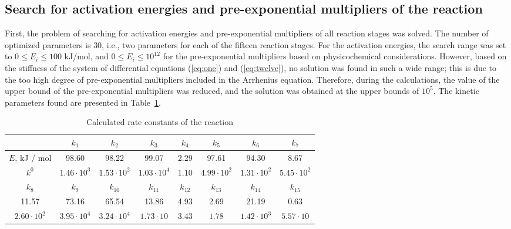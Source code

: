 \documentclass{svproc}
\begin{document}
\subsection{Search for activation energies and pre-exponential multipliers of the reaction}

First, the problem of searching for activation energies and pre-exponential multipliers of all reaction stages was solved. The number of optimized parameters is 30, i.e., two parameters for each of the fifteen reaction stages. For the activation energies, the search range was set to $0 \leq E_i \leq 100$ kJ/mol, and $0 \leq E_i \leq 10^{12}$ for the pre-exponential multipliers based on physicochemical considerations. However, based on the stiffness of the system of differential equations (\ref{eq:one}) and (\ref{eq:twelve}), no solution was found in such a wide range; this is due to the too high degree of pre-exponential multipliers included in the Arrhenius equation. Therefore, during the calculations, the value of the upper bound of the pre-exponential multipliers was reduced, and the solution was obtained at the upper bounds of $10^5$. The kinetic parameters found are presented in Table~\ref{table_res1}.

\begin{table}
\caption{Calculated rate constants of the reaction}
\label{table_res1}
\begin{center}
\begin{tabular}{cccccccc}
\hline
 & $k_1$ & $k_2$ & $k_3$ & $k_4$ & $k_5$ & $k_6$ & $k_7$\\
\hline\rule{0pt}{12pt}
$E$, kJ / mol & 98.60 & 98.22 & 99.07 & 2.29 & 97.61 & 94.30 & 8.67\\
$k^0$ & $1.46\cdot10^3$ & $1.53\cdot10^2$ & $1.03\cdot10^4$ & $1.10$ & $4.99\cdot10^2$  & $1.31\cdot10^2$ & $5.45\cdot10^2$\\
\hline
$k_8$ & $k_9$ & $k_{10}$ & $k_{11}$ & $k_{12}$ & $k_{13}$ & $k_{14}$ & $k_{15}$ \\
\hline\rule{0pt}{12pt}
11.57 & 73.16 & 65.54 & 13.86 & 4.93 & 2.69 & 21.19 & 0.63\\
$2.60\cdot10^2$ & $3.95\cdot10^4$ & $3.24\cdot10^4$ & $1.73\cdot10$ & $3.43$ & $1.78$ & $1.42\cdot10^3$ & $5.57\cdot10$\\[2pt]
\hline
\end{tabular}\end{center}\end{table}
\end{document}
